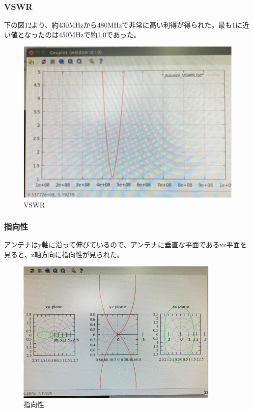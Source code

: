 \documentclass[dvipdfmx,autodetect-engine,titlepage]{jsarticle}
\begin{document}
\subsubsection{VSWR}
下の図12より、約430MHzから480MHzで非常に高い利得が得られた。最も1に近い値となったのは450MHzで約1.0であった。\\
\begin{figure}[H]
  \centering
  \includegraphics[scale=0.45]{yagi2.jpg}
  \caption{VSWR}\label{fig:図14}
\end{figure}

\subsubsection{指向性}
アンテナはy軸に沿って伸びているので、アンテナに垂直な平面であるxz平面を見ると、z軸方向に指向性が見られた。
\begin{figure}[H]
  \centering
  \includegraphics[scale=0.6]{yagi3.png}
  \caption{指向性}\label{fig:図15}
\end{figure}
\end{document}
